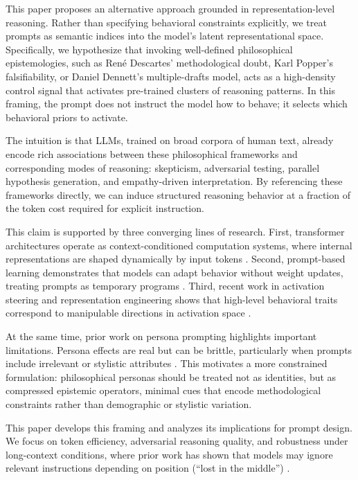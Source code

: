 \documentclass[11pt]{article}
\begin{document}
This paper proposes an alternative approach grounded in representation-level reasoning. Rather than specifying behavioral constraints explicitly, we treat prompts as semantic indices into the model’s latent representational space. Specifically, we hypothesize that invoking well-defined philosophical epistemologies, such as René Descartes’ methodological doubt, Karl Popper’s falsifiability, or Daniel Dennett’s multiple-drafts model, acts as a high-density control signal that activates pre-trained clusters of reasoning patterns. In this framing, the prompt does not instruct the model how to behave; it selects which behavioral priors to activate.

The intuition is that LLMs, trained on broad corpora of human text, already encode rich associations between these philosophical frameworks and corresponding modes of reasoning: skepticism, adversarial testing, parallel hypothesis generation, and empathy-driven interpretation. By referencing these frameworks directly, we can induce structured reasoning behavior at a fraction of the token cost required for explicit instruction.

This claim is supported by three converging lines of research. First, transformer architectures operate as context-conditioned computation systems, where internal representations are shaped dynamically by input tokens \cite{vaswani2017attention}. Second, prompt-based learning demonstrates that models can adapt behavior without weight updates, treating prompts as temporary programs \cite{liu2021prompt}. Third, recent work in activation steering and representation engineering shows that high-level behavioral traits correspond to manipulable directions in activation space \cite{turner2023actadd,anthropic2025persona}.

At the same time, prior work on persona prompting highlights important limitations. Persona effects are real but can be brittle, particularly when prompts include irrelevant or stylistic attributes \cite{araujo2025principled}. This motivates a more constrained formulation: philosophical personas should be treated not as identities, but as compressed epistemic operators, minimal cues that encode methodological constraints rather than demographic or stylistic variation.

This paper develops this framing and analyzes its implications for prompt design. We focus on token efficiency, adversarial reasoning quality, and robustness under long-context conditions, where prior work has shown that models may ignore relevant instructions depending on position (“lost in the middle”) \cite{liu2023lostmiddle}.
\end{document}
